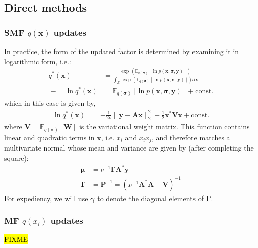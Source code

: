\documentclass{article}
\newcommand{\m}[1]{\boldsymbol{#1}}
\newcommand{\E}[2]{\mathbb{E}_{#2}\left[ #1 \right]}
\begin{document}
\subsection{Direct methods}
\label{ss:var_direct}

\subsubsection{SMF $q(\m{x})$ updates}
In practice, the form of the updated factor is determined by examining
it in logarithmic form, i.e.:
\begin{equation}
\begin{aligned}
q^*(\m{x}) &= \frac{
 \exp\left(
  \E{\ln p(\m{x}, \m{\sigma}, \m{y})}{q(\m{\sigma})}
 \right)}
{\int_{\mathcal{X}} \exp\left(
  \E{\ln p(\m{x}, \m{\sigma}, \m{y})}{q(\m{\sigma})}
 \right) d\m{x}}
\\ \equiv \quad
\ln q^*(\m{x}) &=
 \E{\ln p(\m{x}, \m{\sigma}, \m{y})}{q(\m{\sigma})} + \text{const.}
\end{aligned}
\label{eq:direct_smf_x}
\end{equation}
which in this case is given by,
\begin{equation*}
\begin{aligned}
\ln q^*(\m{x}) &=
 -\frac{1}{2 \nu} \| \m{y} - \m{A} \m{x} \|_2^2
 -\frac{1}{2} \m{x}^* \m{V} \m{x}
 +\text{const.}
\end{aligned}
\end{equation*}
where $\m{V} = \E{\m{W}}{q(\m{\sigma})}$ is the variational weight matrix.
This function contains linear and quadratic terms in $\m{x}$, i.e. $x_i$
and $x_i x_j$, and therefore matches a multivariate normal whose mean
and variance are given by (after completing the square):
\begin{equation*}
\begin{aligned}
\m{\mu} &= \nu^{-1} \m{\Gamma} \m{A}^* \m{y}
\\
\m{\Gamma} &=
 \m{P}^{-1} = \left( \nu^{-1} \m{A}^* \m{A} + \m{V} \right)^{-1}
\end{aligned}
\end{equation*}
For expediency, we will use $\m{\gamma}$ to denote the diagonal elements
of $\m{\Gamma}$.

\subsubsection{MF $q(x_i)$ updates}
\hl{FIXME}
\end{document}
